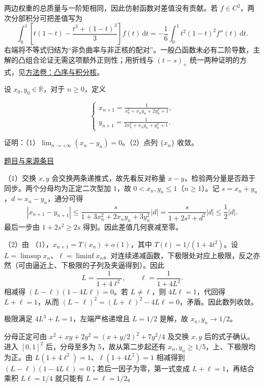 \documentclass[12pt,fontset=fandol]{ctexart}
\begin{document}
\begin{remark}[方法与条件]两边权重的总质量与一阶矩相同，因此仿射函数对差值没有贡献。若 $f\in C^2$，两次分部积分可把差值写为
\[
\int_0^1\left[t(1-t)-\frac{t^3+(1-t)^3}{3}\right]f(t)\,\mathrm dt
=-\frac16\int_0^1t^2(1-t)^2f''(t)\,\mathrm dt.
\]
右端将不等式归结为“非负曲率与非正核的配对”。一般凸函数未必有二阶导数，主解的凸组合论证无需这项额外正则性；用折线与 $(t-s)_+$ 统一两种证明的方式，见\hyperref[app:estimate-convexity]{方法卷：凸序与积分核}。\end{remark}

\begin{example}[来源序号5]\label{ex:ch05-14th-A-makeup:5}\label{pr:ch05-14th-A-makeup:5}

设 $x_0,y_0 \in \mathbb{R}$，对于 $n \geq 0$，定义

\[
\begin{cases}
x_{n+1} = \frac{1}{x_n^2+x_n y_n+2 y_n^2+1}, \\
y_{n+1} = \frac{1}{2 x_n^2+x_n y_n+y_n^2+1}.
\end{cases}
\]

证明：（1）$\lim_{n \to +\infty} \left(x_n-y_n\right) = 0$。（2）点列 $\{x_n\}$ 收敛。

\par\href{https://github.com/lzxcr/cmc-mathematics/blob/64916fa1fdbc3e444a652eca204d5669058ee321/src/problems/preliminary/14-makeup/05.md}{题目与来源条目}

\end{example}

\begin{solve}\label{ans:ch05-14th-A-makeup:5}

（1）交换 $x,y$ 会交换两条递推式，故先看反对称量 $x-y$，检验两分量是否趋于同步。两个分母均为正定二次型加 $1$，故 $0<x_n,y_n\leq1$（$n\geq1$）。记 $s=x_n+y_n$，$d=x_n-y_n$，通分可得
\[
|x_{n+1}-y_{n+1}|
\leq\frac{s}{1+3x_n^2+2x_ny_n+3y_n^2}|d|
=\frac{s}{1+2s^2+d^2}|d|
\leq\frac12|d|.
\]
最后一步由 $1+2s^2\geq2s$ 得到。因此差值几何衰减至零。

（2）由 （1），$x_{n+1}=T(x_n)+o(1)$，其中 $T(t)=1/(1+4t^2)$。设 $L=\limsup x_n$、$\ell=\liminf x_n$。对连续递减函数，下极限处对应上极限，反之亦然（可由逼近上、下极限的子列及夹逼得到）。因此
\[
L=\frac1{1+4\ell^2},\qquad
\ell=\frac1{1+4L^2}.
\]
相减得 $(L-\ell)(1-4L\ell)=0$。若 $L\neq\ell$，则 $4L\ell=1$，代回得 $L+\ell=1$，从而 $(L-\ell)^2=(L+\ell)^2-4L\ell=0$，矛盾。因此数列收敛。

极限满足 $4L^3+L=1$，左端严格递增且 $L=1/2$ 是解，故 $x_n,y_n\to1/2$。

分母正定可由 $x^2+xy+2y^2=(x+y/2)^2+7y^2/4$ 及交换 $x,y$ 后的式子确认。进入 $[0,1]^2$ 后，分母至多为 $5$，故从第二步起还有 $x_n,y_n\ge1/5$，上、下极限均为正。由 $L(1+4\ell^2)=1$、$\ell(1+4L^2)=1$ 相减得到 $(L-\ell)(1-4L\ell)=0$；若后一因子为零，第一式变成 $L+\ell=1$，再结合乘积 $L\ell=1/4$ 就只能有 $L=\ell=1/2$。

\end{solve}
\end{document}

